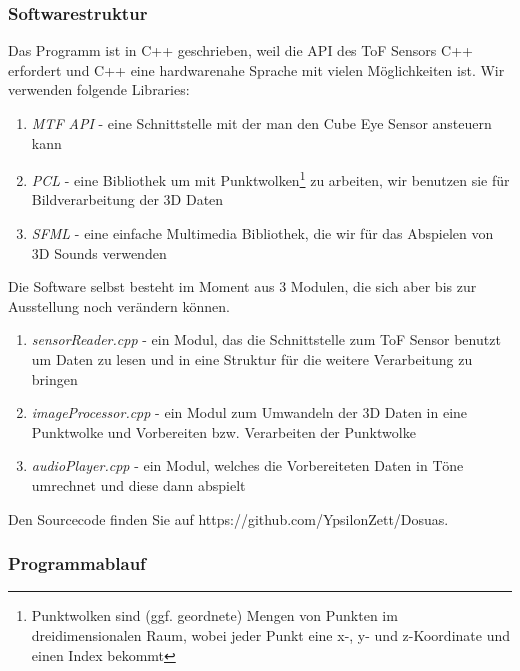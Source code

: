 \documentclass[a4paper,12pt,ngerman]{scrartcl}
\begin{document}
\subsubsection{Softwarestruktur}

Das Programm ist in C++ geschrieben, weil die API des ToF Sensors C++ erfordert und C++ eine hardwarenahe
Sprache mit vielen Möglichkeiten ist. Wir verwenden folgende Libraries:
\begin{enumerate}
	\item \textit{MTF API} - eine Schnittstelle mit der man den Cube Eye Sensor ansteuern kann
	\item \textit{PCL} - eine Bibliothek um mit Punktwolken\footnote{Punktwolken sind (ggf. geordnete) Mengen von Punkten im dreidimensionalen Raum, 
		wobei jeder Punkt eine x-, y- und z-Koordinate und einen Index bekommt} zu arbeiten, wir benutzen 
	sie für Bildverarbeitung der 3D Daten
	\item \textit{SFML} - eine einfache Multimedia Bibliothek, 
	die wir für das Abspielen von 3D Sounds verwenden 
\end{enumerate} 
Die Software selbst besteht im Moment aus 3 Modulen, die sich aber bis zur Ausstellung noch verändern 
können.
\begin{enumerate}
	\item \textit{sensorReader.cpp} - ein Modul, das die Schnittstelle zum ToF Sensor benutzt um Daten zu 
	lesen und in eine Struktur für die weitere Verarbeitung zu bringen
	\item \textit{imageProcessor.cpp} - ein Modul zum Umwandeln der 3D Daten in eine Punktwolke und 
	Vorbereiten bzw. Verarbeiten der Punktwolke
	\item \textit{audioPlayer.cpp} - ein Modul, welches die Vorbereiteten Daten in Töne umrechnet und 
	diese dann abspielt
\end{enumerate}

Den Sourcecode finden Sie auf https://github.com/YpsilonZett/Dosuas.

\subsubsection{Programmablauf}
\end{document}
